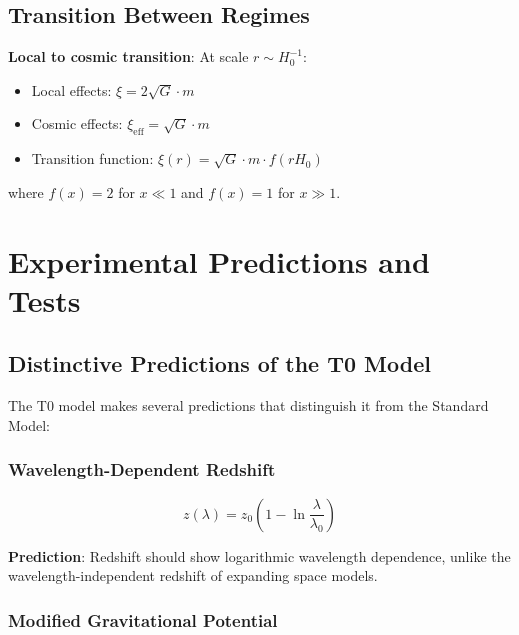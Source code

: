 \documentclass[12pt,a4paper]{article}
\begin{document}
	\subsection{Transition Between Regimes}
	\label{subsec:regime_transitions}
	
	\textbf{Local to cosmic transition}: At scale $r \sim H_0^{-1}$:
	\begin{itemize}
		\item Local effects: $\xi = 2\sqrt{G} \cdot m$
		\item Cosmic effects: $\xi_{\text{eff}} = \sqrt{G} \cdot m$
		\item Transition function: $\xi(r) = \sqrt{G} \cdot m \cdot f(r H_0)$
	\end{itemize}
	
	where $f(x) = 2$ for $x \ll 1$ and $f(x) = 1$ for $x \gg 1$.
	
	\section{Experimental Predictions and Tests}
	\label{sec:experimental_predictions}
	
	\subsection{Distinctive Predictions of the T0 Model}
	\label{subsec:distinctive_predictions}
	
	The T0 model makes several predictions that distinguish it from the Standard Model:
	
	\subsubsection{Wavelength-Dependent Redshift}
	\label{subsubsec:wavelength_redshift}
	
	\begin{equation}
		\boxed{z(\lambda) = z_0\left(1 - \ln\frac{\lambda}{\lambda_0}\right)}
	\end{equation}
	
	\textbf{Prediction}: Redshift should show logarithmic wavelength dependence, unlike the wavelength-independent redshift of expanding space models.
	
	\subsubsection{Modified Gravitational Potential}
	\label{subsubsec:modified_potential}
	
\end{document}
